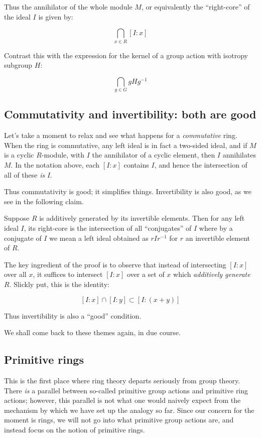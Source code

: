 \documentclass[a4paper]{amsart}
\begin{document}
Thus the annihilator of the whole module $M$, or equivalently the
``right-core'' of the ideal $I$ is given by:

$$\bigcap_{x \in R} [I:x]$$

Contrast this with the expression for the kernel of a group action
with isotropy subgroup $H$:

$$\bigcap_{g \in G} gHg^{-1}$$

\subsection{Commutativity and invertibility: both are good}

Let's take a moment to relax and see what happens for a {\em
  commutative} ring. When the ring is commutative, any left ideal is
in fact a two-sided ideal, and if $M$ is a cyclic $R$-module, with $I$
the annihilator of a cyclic element, then $I$ annihilates $M$. In the
notation above, each $[I:x]$ contains $I$, and hence the intersection
of all of these {\em is} $I$.

Thus commutativity is good; it simplifies things. Invertibility is
also good, as we see in the following claim.

\begin{claimer}
  Suppose $R$ is additively generated by its invertible elements.
  Then for any left ideal $I$, its right-core is the intersection of
  all ``conjugates'' of $I$ where by a conjugate of $I$ we mean a left
  ideal obtained as $rIr^{-1}$ for $r$ an invertible element of $R$.
\end{claimer}

The key ingredient of the proof is to observe that instead of
intersecting $[I:x]$ over all $x$, it suffices to intersect $[I:x]$
over a set of $x$ which {\em additively generate} $R$. Slickly put,
this is the identity:

$$[I:x] \cap [I:y] \subset [I:(x + y)]$$

Thus invertibility is also a ``good'' condition.

We shall come back to these themes again, in due course.

\subsection{Primitive rings}

This is the first place where ring theory departs seriously from group
theory. There {\em is} a parallel between so-called primitive group
actions and primitive ring actions; however, this parallel is not what
one would naively expect from the mechanism by which we have set up
the analogy so far. Since our concern for the moment is rings, we will
not go into what primitive group actions are, and instead focus on the
notion of primitive rings.
\end{document}
